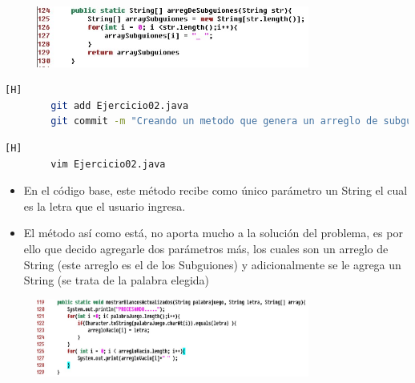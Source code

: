 \documentclass{article}
\begin{document}
	\begin{figure}[H]
		\centering
		\includegraphics[width=0.8\textwidth,keepaspectratio]{img/arregloSubguiones.jpg}
	\end{figure}
	
	\begin{lstlisting}[language=bash,caption={Commit: Creando un método que genera un arreglo de subguiones de con tamaño de acuerdo a la palabra elegida }][H]
		git add Ejercicio02.java
		git commit -m "Creando un metodo que genera un arreglo de subguiones de con tamano de acuerdo a la palabra elegida"
	\end{lstlisting}

	
	\begin{lstlisting}[language=bash,caption={Corrigiendo los parámatros del método mostrarBlancosActualizados}][H]
		vim Ejercicio02.java
	\end{lstlisting}
	
	\begin{itemize}	
		\item En el código base, este método recibe como único parámetro un String el cual es la letra que el usuario ingresa. 
		\item El método así como está, no aporta mucho a la solución del problema, es por ello que decido agregarle dos parámetros más, los cuales son un arreglo de String (este arreglo es el de los Subguiones) y adicionalmente se le agrega un String (se trata de la palabra elegida)
	\end{itemize}
	
	\begin{figure}[H]
		\centering
		\includegraphics[width=0.8\textwidth,keepaspectratio]{img/mostrandoBlancosActualizados.jpg}
	\end{figure}
	
\end{document}
